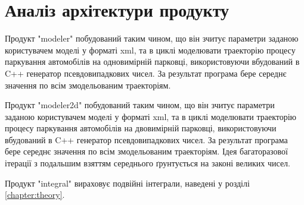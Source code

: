 \section{Аналіз архітектури продукту}

Продукт "modeler" побудований таким чином, що він зчитує параметри заданою користувачем моделі у форматі xml, та в циклі моделювати траекторію процесу паркування автомобілів на одновимірній парковці, використовуючи вбудований в C++ генератор псевдовипадкових чисел. За результат програма бере середнє значення по всім змодельованим траекторіям.

Продукт "modeler2d" побудований таким чином, що він зчитує параметри заданою користувачем моделі у форматі xml, та в циклі моделювати траекторію процесу паркування автомобілів на двовимірній парковці, використовуючи вбудований в C++ генератор псевдовипадкових чисел. За результат програма бере середнє значення по всім змодельованим траекторіям. Ідея багаторазової ітерації з подальшим взяттям середнього ґрунтується на законі великих чисел.

Продукт "integral" вираховує подвійні інтеграли, наведені у розділі \ref{chapter:theory}.
